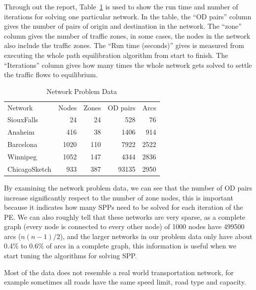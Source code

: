 Through out the report, Table~\ref{table:problemdata} is used to show the run time and number of iterations for solving one particular network.
In the table, the ``OD pairs'' column gives the number of pairs of origin and destination in the network.
The ``zone'' column gives the number of traffic zones,
in some cases, the nodes in the network also include the traffic zones.
The ``Run time (seconds)'' gives is measured from executing the whole 
path equilibration algorithm from start to finish.
The ``Iterations'' column gives how many times the whole network
gets solved to settle the traffic flows to equilibrium.
\begin{table}[H]
    \centering
    \begin{tabular}{lrrrr} \toprule
        Network & Nodes & Zones & OD pairs & Arcs \\ \cmidrule(lr){1-5}
        SiouxFalls    & 24   & 24  & 528   & 76   \\
        Anaheim       & 416  & 38  & 1406  & 914  \\
        Barcelona     & 1020 & 110 & 7922  & 2522 \\
        Winnipeg      & 1052 & 147 & 4344  & 2836 \\
        ChicagoSketch & 933  & 387 & 93135 & 2950 \\ \bottomrule
    \end{tabular}
    \caption{Network Problem Data}
    \label{table:problemdata}
\end{table}
By examining the network problem data,
we can see that the number of OD pairs increase
significantly respect to the number of zone nodes,
this is important because it indicates how many SPPs need to be solved for each iteration of the PE.
We can also roughly tell that these networks are very sparse,
as a complete graph (every node is connected to every other node) of 1000 nodes have 499500 arcs ($n(n-1)/2$),
and the larger networks in our problem data only have about 0.4\% to 0.6\% of arcs in a complete graph, this information is useful
when we start tuning the algorithms for solving SPP.

Most of the data does not resemble a real world transportation network, 
for example sometimes all roads have the same speed limit, road type and capacity.  

